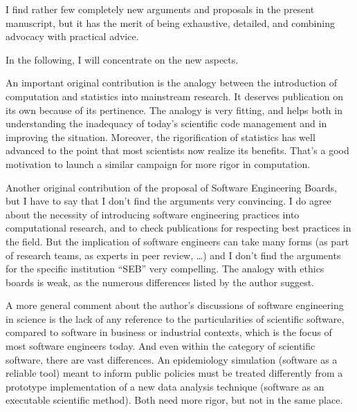 \documentclass[11pt]{article}
\begin{document}
I find rather few completely new arguments and proposals in the present manuscript, but it has the merit of being exhaustive, detailed, and combining advocacy with practical advice. 

In the following, I will concentrate on the new aspects.

An important original contribution is the analogy between the introduction of computation and statistics into mainstream research. It deserves publication on its own because of its pertinence. The analogy is very fitting, and helps both in understanding the inadequacy of today's scientific code management and in improving the situation. Moreover, the rigorification of statistics has well advanced to the point that most scientists now realize its benefits. That's a good motivation to launch a similar campaign for more rigor in computation. 

Another original contribution of the proposal of Software Engineering Boards, but I have to say that I don't find the arguments very convincing. I do agree about the necessity of introducing software engineering practices into computational research, and to check publications for respecting best practices in the field. But the implication of software engineers can take many forms (as part of research teams, as experts in peer review, \ldots) and I don't find the arguments for the specific institution ``SEB'' very compelling. The analogy with ethics boards is weak, as the numerous differences listed by the author suggest. 

A more general comment about the author's discussions of software engineering in science is the lack of any reference to the particularities of scientific software, compared to software in business or industrial contexts, which is the focus of most software engineers today. And even within the category of scientific software, there are vast differences. An epidemiology simulation (software as a reliable tool) meant to inform public policies must be treated differently from a prototype implementation of a new data analysis technique (software as an executable scientific method). Both need more rigor, but not in the same place. 
\end{document}
